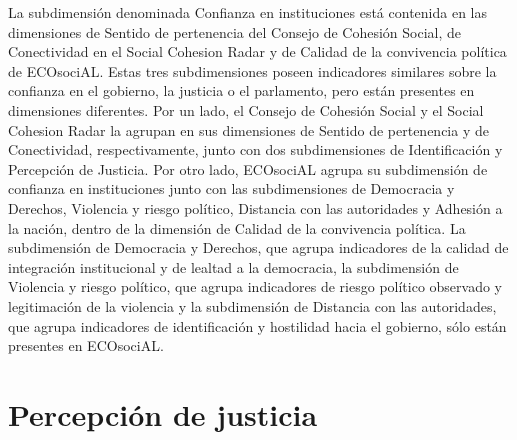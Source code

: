 \documentclass[
  12pt,
]{book}
\begin{document}
La subdimensión denominada Confianza en instituciones está contenida en las dimensiones de Sentido de pertenencia del Consejo de Cohesión Social, de Conectividad en el Social Cohesion Radar y de Calidad de la convivencia política de ECOsociAL. Estas tres subdimensiones poseen indicadores similares sobre la confianza en el gobierno, la justicia o el parlamento, pero están presentes en dimensiones diferentes. Por un lado, el Consejo de Cohesión Social y el Social Cohesion Radar la agrupan en sus dimensiones de Sentido de pertenencia y de Conectividad, respectivamente, junto con dos subdimensiones de Identificación y Percepción de Justicia. Por otro lado, ECOsociAL agrupa su subdimensión de confianza en instituciones junto con las subdimensiones de Democracia y Derechos, Violencia y riesgo político, Distancia con las autoridades y Adhesión a la nación, dentro de la dimensión de Calidad de la convivencia política. La subdimensión de Democracia y Derechos, que agrupa indicadores de la calidad de integración institucional y de lealtad a la democracia, la subdimensión de Violencia y riesgo político, que agrupa indicadores de riesgo político observado y legitimación de la violencia y la subdimensión de Distancia con las autoridades, que agrupa indicadores de identificación y hostilidad hacia el gobierno, sólo están presentes en ECOsociAL.

\hypertarget{percepciuxf3n-de-justicia}{%
\section{Percepción de justicia}\label{percepciuxf3n-de-justicia}}
\end{document}
